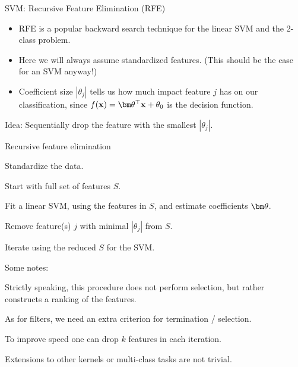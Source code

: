 \begin{vbframe}{SVM: Recursive Feature Elimination (RFE)}
\begin{itemize}
  \item RFE is a popular backward search technique for the linear SVM and the 2-class problem.
  \item Here we will always assume standardized features. (This should be the case for an SVM anyway!)
  \item Coefficient size $|\theta_j|$ tells us how much impact feature $j$ has on our classification,
  since $f(\xv) = \thetab^\top \xv + \theta_0$ is the decision function.
\end{itemize}

Idea: Sequentially drop the feature with the smallest $|\theta_j|$.

\framebreak

\begin{blocki}{Recursive feature elimination}
  \item Standardize the data.
  \item Start with full set of features $S$.
  \item Fit a linear SVM, using the features in $S$, and estimate coefficients $\thetab$.
  \item Remove feature(s) $j$ with minimal $|\theta_j|$ from $S$.
  \item Iterate using the reduced $S$ for the SVM.
\end{blocki}

\framebreak

\begin{blocki}{Some notes:}
  \item Strictly speaking, this procedure does not perform selection, but rather constructs a ranking of the features.
  \item As for filters, we need an extra criterion for termination / selection.
  \item To improve speed one can drop $k$ features in each iteration.
  \item Extensions to other kernels or multi-class tasks are not trivial.
\end{blocki}

\end{vbframe}

